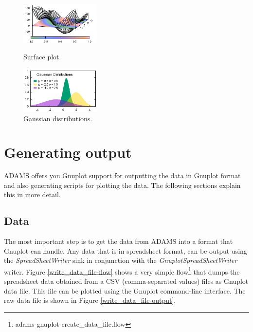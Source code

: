 \documentclass[a4paper]{book}
\begin{document}
\begin{figure}[htb]
  \begin{minipage}[b]{0.5\linewidth}
  \centering
  \includegraphics[width=4cm]{images/example_plot1.png}
  \caption{Surface plot.}
  \label{example_plot1}
  \end{minipage}%
  \begin{minipage}[b]{0.5\linewidth}
  \centering
  \includegraphics[width=4cm]{images/example_plot2.png}
  \caption{Gaussian distributions.}
  \label{example_plot2}
  \end{minipage}
\end{figure}

\chapter{Generating output}
ADAMS offers you Gnuplot support for outputting the data in Gnuplot format
and also generating scripts for plotting the data. The following sections
explain this in more detail.

\section{Data}
The most important step is to get the data from ADAMS into a format that 
Gnuplot can handle. Any data that is in spreadsheet format, can be output
using the \textit{SpreadSheetWriter} sink in conjunction with the 
\textit{GnuplotSpreadSheetWriter} writer. Figure \ref{write_data_file-flow} shows
a very simple flow\footnote{adams-gnuplot-create\_data\_file.flow} that dumps
the spreadsheet data obtained from a CSV (comma-separated values) files as
Gnuplot data file. This file can be plotted using the Gnuplot command-line
interface. The raw data file is shown in Figure \ref{write_data_file-output}.
\end{document}
